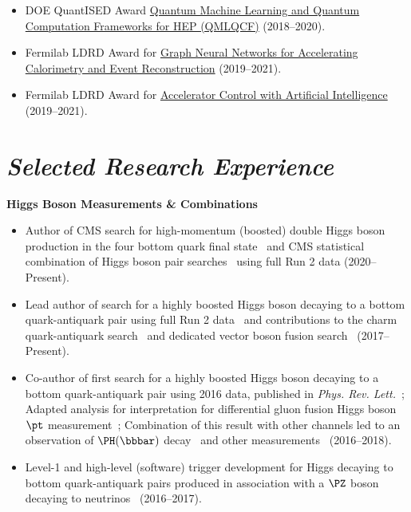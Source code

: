 \documentclass[11pt]{res}
\newcommand{\MarginText}[1]{\section{\textit{#1}}}
\begin{document}
\begin{resume}
\begin{itemize}
    \item DOE QuantISED Award \href{https://pamspublic.science.energy.gov/WebPAMSExternal/Interface/Common/ViewPublicAbstract.aspx?rv=1f7d4729-6f93-40bd-a55f-c108545b1ea9&rtc=24&PRoleId=10}{Quantum Machine Learning and Quantum Computation Frameworks for HEP (QMLQCF)} ({2018--2020}).
    \item Fermilab LDRD Award for \href{https://ldrd.fnal.gov/subdir/FNAL-LDRD-2019-017-D1.pdf}{Graph Neural Networks for Accelerating Calorimetry and Event Reconstruction} ({2019--2021}).
    \item Fermilab LDRD Award for \href{https://ldrd.fnal.gov/subdir/FNAL-LDRD-2019-027-D1.pdf}{Accelerator Control with Artificial Intelligence} ({2019--2021}).
  \end{itemize}

  \MarginText{Selected Research Experience}

  \textbf{Higgs Boson Measurements \& Combinations}
  \begin{itemize}
    \itemsep-0.3em
    \item Author of CMS search for high-momentum (boosted) double Higgs boson production in the four bottom quark final state~\cite{CMS:2022nmn} and CMS statistical combination of Higgs boson pair searches~\cite{CMS:2022dwd} using full Run 2 data ({2020--Present}).
    \item Lead author of search for a highly boosted Higgs boson decaying to a bottom quark-antiquark pair using full Run 2 data~\cite{Sirunyan:2020hwz} and contributions to the charm quark-antiquark search~\cite{CMS:2022wqf} and dedicated vector boson fusion search~\cite{CMS-PAS-HIG-21-020} ({2017--Present}).
    \item Co-author of first search for a highly boosted Higgs boson decaying to a bottom quark-antiquark pair using 2016 data, published in \emph{Phys. Rev. Lett.}~\cite{Sirunyan:2017dgc}; Adapted analysis for interpretation for differential gluon fusion Higgs boson $\pt$ measurement~\cite{Sirunyan:2018sgc}; Combination of this result with other channels led to an observation of $\PH(\bbbar)$ decay~\cite{Sirunyan:2018kst} and other measurements~\cite{Sirunyan:2018koj} ({2016--2018}).
    \item Level-1 and high-level (software) trigger development for Higgs decaying to bottom quark-antiquark pairs produced in association with a $\PZ$ boson decaying to neutrinos~\cite{Sirunyan:2018kst} ({2016--2017}).
  \end{itemize}


\end{resume}
\end{document}
